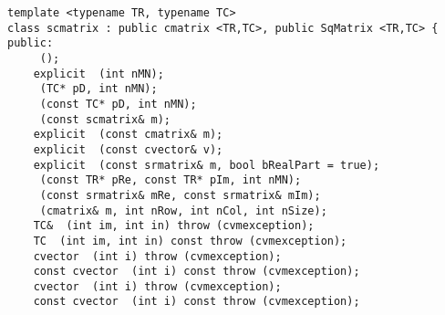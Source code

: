 \bigskip
\noindent
\verb"template <typename TR, typename TC>"\\
\verb"class scmatrix : public cmatrix <TR,TC>, public SqMatrix <TR,TC> {"\\
\verb"public:"\\
\verb"    "\verb" ();"\\
\verb"    explicit "\verb" (int nMN);"\\
\verb"    "\verb" (TC* pD, int nMN);"\\
\verb"    "\verb" (const TC* pD, int nMN);"\\
\verb"    "\verb" (const scmatrix& m);"\\
\verb"    explicit "\verb" (const cmatrix& m);"\\
\verb"    explicit "\verb" (const cvector& v);"\\
\verb"    explicit "\verb" (const srmatrix& m, bool bRealPart = true);"\\
\verb"    "\verb" (const TR* pRe, const TR* pIm, int nMN);"\\
\verb"    "\verb" (const srmatrix& mRe, const srmatrix& mIm);"\\
\verb"    "\verb" (cmatrix& m, int nRow, int nCol, int nSize);"\\
\verb"    TC& "\verb" (int im, int in) throw (cvmexception);"\\
\verb"    TC "\verb" (int im, int in) const throw (cvmexception);"\\
\verb"    cvector "\verb" (int i) throw (cvmexception);"\\
\verb"    const cvector "\verb" (int i) const throw (cvmexception);"\\
\verb"    cvector "\verb" (int i) throw (cvmexception);"\\
\verb"    const cvector "\verb" (int i) const throw (cvmexception);"\\
